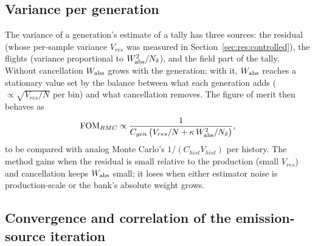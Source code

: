 \subsection{Variance per generation}

The variance of a generation's estimate of a tally has three sources: the residual (whose per-sample
variance $V_{res}$ was measured in Section~\ref{sec:res:controlled}), the flights (variance proportional
to $W_{\mathrm{abs}}^2/N_\delta$), and the field part of the tally. Without cancellation $W_{\mathrm{abs}}$ grows with the
generation; with it, $W_{\mathrm{abs}}$ reaches a stationary value set by the balance between what each
generation adds ($\propto\sqrt{V_{res}/N}$ per bin) and what cancellation removes. The figure of merit
then behaves as
\begin{equation}
\mathrm{FOM}_{RMC}\propto\frac{1}{C_{gen}\,\big(V_{res}/N+\kappa\,W_{\mathrm{abs}}^2/N_\delta\big)},
\end{equation}
to be compared with analog Monte Carlo's $1/(C_{hist}V_{hist})$ per history. The method gains when the
residual is small relative to the production (small $V_{res}$) and cancellation keeps $W_{\mathrm{abs}}$ small;
it loses when either estimator noise is production-scale or the bank's absolute weight grows.

\subsection{Convergence and correlation of the emission-source iteration}\label{sec:convergence}

